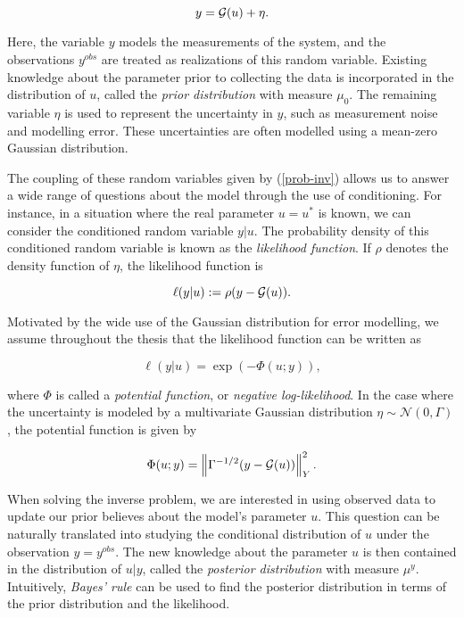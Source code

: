 \begin{equation}\label{prob-inv}
  y = \mathcal{G}(u) + \eta.
\end{equation}

Here, the variable $y$ models the measurements of the system, and the observations $y^{obs}$ are treated as realizations of this random variable. Existing knowledge about the parameter prior to collecting the data is incorporated in the distribution of $u$, called the \textit{prior distribution} with measure $\mu_0$. The remaining variable $\eta$ is used to represent the uncertainty in $y$, such as measurement noise and modelling error. These uncertainties are often modelled using a mean-zero Gaussian distribution.

The coupling of these random variables given by (\ref{prob-inv}) allows us to answer a wide range of questions about the model through the use of conditioning. For instance, in a situation where the real parameter $u = u^*$ is known, we can consider the conditioned random variable $y|u$. The probability density of this conditioned random variable is known as the \textit{likelihood function}. If  $\rho$ denotes the density function of $\eta$, the likelihood function is

\begin{equation}\label{def-ell}
  \ell(y|u) := \rho(y - \mathcal{G}(u)).
\end{equation}

Motivated by the wide use of the Gaussian distribution for error modelling, we assume throughout the thesis that the likelihood function can be written as

\begin{equation} \label{exponential-ell}
  \ell(y|u) = \exp(-\Phi(u;y)),
\end{equation}

where $\Phi$ is called a \textit{potential function}, or \textit{negative log-likelihood}. In the case where the uncertainty is modeled by a multivariate Gaussian distribution $\eta \sim \mathcal{N}(0, \Gamma)$, the potential function is given by

\begin{equation} \label{gaussian-potential}
  \Phi(u; y) = \left\lVert\Gamma^{-1/2}(y - \mathcal{G}(u))\right\rVert_Y^2.
\end{equation}

When solving the inverse problem, we are interested in using observed data to update our prior believes about the model's parameter $u$. This question can be naturally translated into studying the conditional distribution of $u$ under the observation $y = y^{obs}$. The new knowledge about the parameter $u$ is then contained in the distribution of $u|y$, called the \textit{posterior distribution} with measure $\mu^y$. Intuitively, \textit{Bayes' rule} can be used to find the posterior distribution in terms of the prior distribution and the likelihood.

